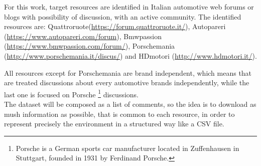 For this work, target resources are identified in Italian automotive web forums or blogs with possibility of discussion, with an active community. The identified resources are: Quattroruote(\url{https://forum.quattroruote.it/}), Autopareri (\url{https://www.autopareri.com/forum}), Bmwpassion (\url{https://www.bmwpassion.com/forum/}), Porschemania (\url{http://www.porschemania.it/discus/}) and HDmotori (\url{http://www.hdmotori.it/}). 







All resources except for Porschemania are brand independent, which means that are treated discussions about every automotive brands independently, while the last one is focused on Porsche \footnote{Porsche is a German sports car manufacturer located in Zuffenhausen in Stuttgart, founded in 1931 by Ferdinand Porsche.} discussions.\\
The dataset will be composed as a list of comments, so the idea is to download as mush information as possible, that is common to each resource, in order to represent precisely the environment in a structured way like a \ac{CSV} file.

